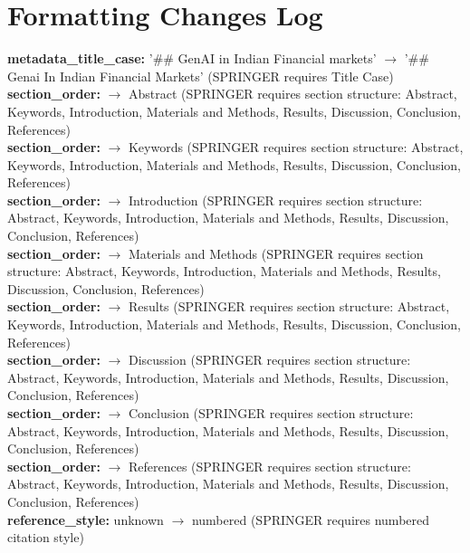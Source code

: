 \documentclass[11pt]{article}
\begin{document}
\section*{Formatting Changes Log}
\textbf{metadata_title_case:} '## GenAI in Indian Financial markets' $\rightarrow$ '## Genai In Indian Financial Markets' (SPRINGER requires Title Case) \\
\textbf{section_order:}  $\rightarrow$ Abstract (SPRINGER requires section structure: Abstract, Keywords, Introduction, Materials and Methods, Results, Discussion, Conclusion, References) \\
\textbf{section_order:}  $\rightarrow$ Keywords (SPRINGER requires section structure: Abstract, Keywords, Introduction, Materials and Methods, Results, Discussion, Conclusion, References) \\
\textbf{section_order:}  $\rightarrow$ Introduction (SPRINGER requires section structure: Abstract, Keywords, Introduction, Materials and Methods, Results, Discussion, Conclusion, References) \\
\textbf{section_order:}  $\rightarrow$ Materials and Methods (SPRINGER requires section structure: Abstract, Keywords, Introduction, Materials and Methods, Results, Discussion, Conclusion, References) \\
\textbf{section_order:}  $\rightarrow$ Results (SPRINGER requires section structure: Abstract, Keywords, Introduction, Materials and Methods, Results, Discussion, Conclusion, References) \\
\textbf{section_order:}  $\rightarrow$ Discussion (SPRINGER requires section structure: Abstract, Keywords, Introduction, Materials and Methods, Results, Discussion, Conclusion, References) \\
\textbf{section_order:}  $\rightarrow$ Conclusion (SPRINGER requires section structure: Abstract, Keywords, Introduction, Materials and Methods, Results, Discussion, Conclusion, References) \\
\textbf{section_order:}  $\rightarrow$ References (SPRINGER requires section structure: Abstract, Keywords, Introduction, Materials and Methods, Results, Discussion, Conclusion, References) \\
\textbf{reference_style:} unknown $\rightarrow$ numbered (SPRINGER requires numbered citation style) \\
\end{document}

